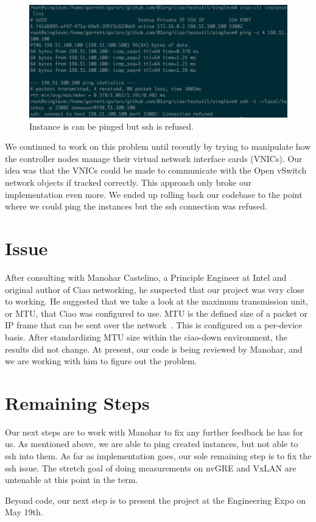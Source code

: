 \documentclass[10pt,onecolumn,journal,draftclsnofoot]{IEEEtran}
\begin{document}
\begin{figure}[H]
\caption{Instance is can be pinged but ssh is refused.}
\includegraphics[scale=0.5]{./ssh-refused.eps}
\end{figure}

We continued to work on this problem until recently by trying to manipulate how
the controller nodes manage their virtual network interface cards (VNICs). Our
idea was that the VNICs could be made to communicate with the Open vSwitch
network objects if tracked correctly. This approach only broke our
implementation even more. We ended up rolling back our codebase to the point
where we could ping the instances but the ssh connection was refused.

\section{Issue}
After consulting with Manohar Castelino, a Principle Engineer at Intel and
original author of Ciao networking, he suspected that our project was very close
to working.  He suggested that we take a look at the maximum transmission unit,
or MTU, that Ciao was configured to use. MTU is the defined size of a packet or
IP frame that can be sent over the network~\cite{MTU}. This is configured on a
per-device basis. After standardizing MTU size within the ciao-down environment,
the results did not change. At present, our code is being reviewed by Manohar,
and we are working with him to figure out the problem.


\section{Remaining Steps}

Our next steps are to work with Manohar to fix any further feedback he has for
us. As mentioned above, we are able to ping created instances, but not able to
ssh into them. As far as implementation goes, our sole remaining step is to fix
the ssh issue. The stretch goal of doing measurements on nvGRE and VxLAN are
untenable at this point in the term.

Beyond code, our next step is to present the project at the Engineering Expo on
May 19th.



\end{document}
